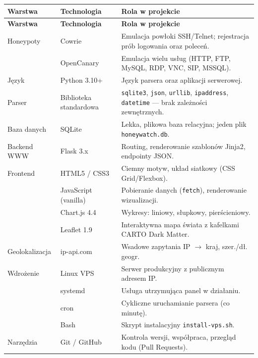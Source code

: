 \documentclass[12pt,a4paper]{report}
\begin{document}
\begin{longtable}{>{\raggedright\arraybackslash}p{3.4cm} >{\raggedright\arraybackslash}p{3.2cm} >{\raggedright\arraybackslash}p{7.2cm}}
\toprule
\textbf{Warstwa} & \textbf{Technologia} & \textbf{Rola w projekcie} \\
\midrule
\endfirsthead
\toprule
\textbf{Warstwa} & \textbf{Technologia} & \textbf{Rola w projekcie} \\
\midrule
\endhead
\bottomrule
\endfoot
Honeypoty & Cowrie & Emulacja powłoki SSH/Telnet; rejestracja prób logowania oraz poleceń. \\
          & OpenCanary & Emulacja wielu usług (HTTP, FTP, MySQL, RDP, VNC, SIP, MSSQL). \\
\midrule
Język & Python 3.10+ & Język parsera oraz aplikacji serwerowej. \\
\midrule
Parser & Biblioteka standardowa & \texttt{sqlite3}, \texttt{json}, \texttt{urllib}, \texttt{ipaddress}, \texttt{datetime} --- brak zależności zewnętrznych. \\
\midrule
Baza danych & SQLite & Lekka, plikowa baza relacyjna; jeden plik \texttt{honeywatch.db}. \\
\midrule
Backend WWW & Flask 3.x & Routing, renderowanie szablonów Jinja2, endpointy JSON. \\
\midrule
Frontend & HTML5 / CSS3 & Ciemny motyw, układ siatkowy (CSS Grid/Flexbox). \\
         & JavaScript (vanilla) & Pobieranie danych (\texttt{fetch}), renderowanie wizualizacji. \\
         & Chart.js 4.4 & Wykresy: liniowy, słupkowy, pierścieniowy. \\
         & Leaflet 1.9 & Interaktywna mapa świata z kafelkami CARTO Dark Matter. \\
\midrule
Geolokalizacja & ip-api.com & Wsadowe zapytania IP $\rightarrow$ kraj, szer./dł. geogr. \\
\midrule
Wdrożenie & Linux VPS & Serwer produkcyjny z publicznym adresem IP. \\
          & systemd & Usługa utrzymująca panel w działaniu. \\
          & cron & Cykliczne uruchamianie parsera (co minutę). \\
          & Bash & Skrypt instalacyjny \texttt{install-vps.sh}. \\
\midrule
Narzędzia & Git / GitHub & Kontrola wersji, współpraca, przegląd kodu (Pull Requests). \\
\end{longtable}
\end{document}
